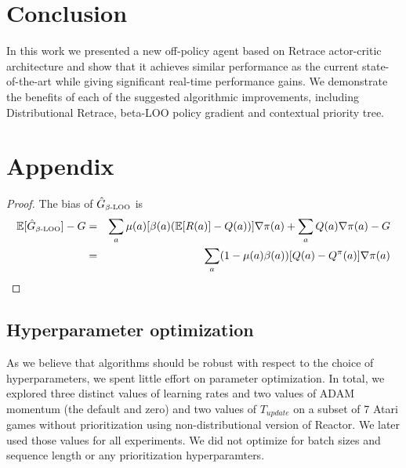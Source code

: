\documentclass{article}
\newcommand{\beqan}{\begin{eqnarray*}}
\newcommand{\eeqan}{\end{eqnarray*}}
\newcommand{\E}{{\mathbb E}}
\begin{document}
\section{Conclusion}
In this work we presented a new off-policy agent based on Retrace actor-critic 
architecture and show that it achieves similar performance as the 
current state-of-the-art while giving significant real-time performance gains. 
We demonstrate the benefits of each of the suggested algorithmic improvements, 
including Distributional Retrace, beta-LOO policy gradient and contextual 
priority tree.



\normalsize

\onecolumn

\section{Appendix}

\propbias*
\begin{proof}
The bias of $\hat G_{\mbox{\tiny $\beta$-LOO}}$ is
\beqan
\E[\hat G_{\mbox{\tiny $\beta$-LOO}}] - G &=& \sum_a \mu(a) [ \beta(a) (\E[R(a)] -Q(a)) ] \nabla\pi(a) + \sum_{a} Q(a) \nabla\pi(a) - G\\
&=& \sum_a (1-\mu(a)\beta(a)) [Q(a)-Q^{\pi}(a)] \nabla\pi(a)
\eeqan
\end{proof}


\subsection{Hyperparameter optimization}\label{sec:par_opt}
As we believe that algorithms should be robust with respect to the choice of 
hyperparameters, we spent little effort on parameter optimization. In total, we 
explored three distinct values of learning rates and two values of ADAM 
momentum (the default and zero) and two values of $T_{update}$ on a subset of 7 
Atari games without prioritization using non-distributional version of Reactor. 
We later used those values for all experiments. We did not optimize for batch 
sizes and sequence length or any prioritization hyperparamters.

\end{document}
